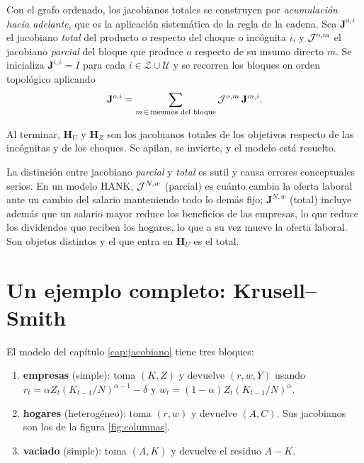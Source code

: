 Con el grafo ordenado, los jacobianos totales se construyen por
\emph{acumulación hacia adelante}, que es la aplicación sistemática de la regla
de la cadena. Sea $\mathbf{J}^{o,i}$ el jacobiano \emph{total} del producto $o$
respecto del choque o incógnita $i$, y $\mathcal{J}^{o,m}$ el jacobiano \emph{parcial} del
bloque que produce $o$ respecto de su insumo directo $m$. Se inicializa
$\mathbf{J}^{i,i} = I$ para cada $i \in \mathcal{Z}\cup\mathcal{U}$ y se recorren
los bloques en orden topológico aplicando
\begin{equation}
\mathbf{J}^{o,i} = \sum_{m\,\in\, \text{insumos del bloque}} \mathcal{J}^{o,m}\,\mathbf{J}^{m,i}.
\label{eq:forward}
\end{equation}

Al terminar, $\mathbf{H}_U$ y $\mathbf{H}_Z$ son los jacobianos totales de los
objetivos respecto de las incógnitas y de los choques. Se apilan, se invierte, y
el modelo está resuelto.

\begin{trampa}
La distinción entre jacobiano \emph{parcial} y \emph{total} es sutil y causa
errores conceptuales serios. En un modelo HANK, $\mathcal{J}^{N,w}$ (parcial) es cuánto
cambia la oferta laboral ante un cambio del salario manteniendo todo lo demás
fijo; $\mathbf{J}^{N,w}$ (total) incluye además que un salario mayor reduce los
beneficios de las empresas, lo que reduce los dividendos que reciben los hogares,
lo que a su vez mueve la oferta laboral. Son objetos distintos y el que entra en
$\mathbf{H}_U$ es el total.
\end{trampa}

\section{Un ejemplo completo: Krusell--Smith}

El modelo del capítulo \ref{cap:jacobiano} tiene tres bloques:

\begin{enumerate}[leftmargin=1.4em,itemsep=1pt]
\item \textbf{empresas} (simple): toma $(K, Z)$ y devuelve $(r, w, Y)$ usando
$r_t = \alpha Z_t (K_{t-1}/N)^{\alpha-1} - \delta$ y
$w_t = (1-\alpha)Z_t(K_{t-1}/N)^{\alpha}$.
\item \textbf{hogares} (heterogéneo): toma $(r,w)$ y devuelve $(A, C)$. Sus
jacobianos son los de la figura \ref{fig:columnas}.
\item \textbf{vaciado} (simple): toma $(A,K)$ y devuelve el residuo $A - K$.
\end{enumerate}

